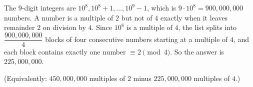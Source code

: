 The $9$-digit integers are $10^8,10^8+1,\dots,10^9-1$, which is $9\cdot10^8=900{,}000{,}000$ numbers. A number is a multiple of $2$ but not of $4$ exactly when it leaves remainder $2$ on division by $4$. Since $10^8$ is a multiple of $4$, the list splits into $\dfrac{900{,}000{,}000}{4}$ blocks of four consecutive numbers starting at a multiple of $4$, and each block contains exactly one number $\equiv2\pmod4$. So the answer is $\boxed{225{,}000{,}000}$.

(Equivalently: $450{,}000{,}000$ multiples of $2$ minus $225{,}000{,}000$ multiples of $4$.)

